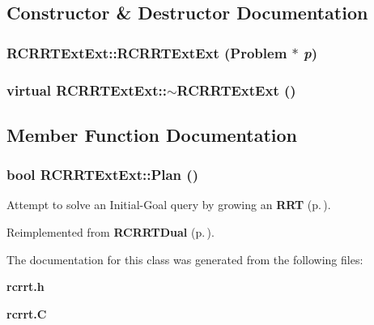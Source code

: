 \subsection{Constructor \& Destructor Documentation}
\subsubsection{\setlength{\rightskip}{0pt plus 5cm}RCRRTExt\-Ext::RCRRTExt\-Ext ({\bf Problem} $\ast$ {\em p})}\label{classRCRRTExtExt_a0}


\subsubsection{\setlength{\rightskip}{0pt plus 5cm}virtual RCRRTExt\-Ext::$\sim$RCRRTExt\-Ext ()\hspace{0.3cm}{\tt  [inline, virtual]}}\label{classRCRRTExtExt_a1}




\subsection{Member Function Documentation}
\subsubsection{\setlength{\rightskip}{0pt plus 5cm}bool RCRRTExt\-Ext::Plan ()\hspace{0.3cm}{\tt  [virtual]}}\label{classRCRRTExtExt_a2}


Attempt to solve an Initial-Goal query by growing an {\bf RRT} {\rm (p.\,\pageref{classRRT})}.



Reimplemented from {\bf RCRRTDual} {\rm (p.\,\pageref{classRCRRTDual_a2})}.

The documentation for this class was generated from the following files:\begin{CompactItemize}
\item 
{\bf rcrrt.h}\item 
{\bf rcrrt.C}\end{CompactItemize}
